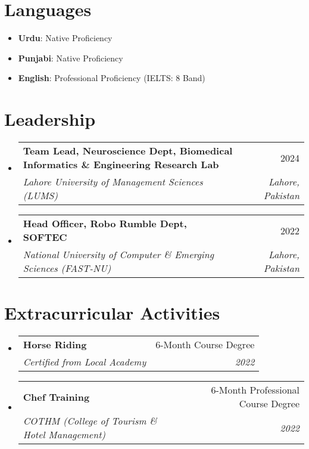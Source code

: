 \documentclass[letterpaper,10pt]{article}
\makeatletter
\newcommand{\resumeItem}[2]{
  \item\small{
    \textbf{#1}{: #2 \vspace{-2pt}}
  }
}
\newcommand{\resumeSubheading}[4]{
  \vspace{-1pt}\item
    \begin{tabular*}{0.97\textwidth}[t]{l@{\extracolsep{\fill}}r}
      \textbf{#1} & #2 \\
      \textit{\small#3} & \textit{\small #4} \\
    \end{tabular*}\vspace{-5pt}
}
\newcommand{\resumeSubItem}[2]{\resumeItem{#1}{#2}\vspace{-4pt}}
\newcommand{\resumeSubHeadingListStart}{\begin{itemize}[leftmargin=*]}
\newcommand{\resumeSubHeadingListEnd}{\end{itemize}}
\makeatother
\begin{document}
\section{Languages}
 \resumeSubHeadingListStart
    \resumeSubItem{Urdu}{Native Proficiency}
    \resumeSubItem{Punjabi}{Native Proficiency}
    \resumeSubItem{English}{Professional Proficiency (IELTS: 8 Band)}
 \resumeSubHeadingListEnd

\section{Leadership}
 \resumeSubHeadingListStart
    \resumeSubheading
        {Team Lead, Neuroscience Dept, Biomedical Informatics \& Engineering Research Lab}{2024}
        {Lahore University of Management Sciences (LUMS)}{Lahore, Pakistan}
    \resumeSubheading
        {Head Officer, Robo Rumble Dept, SOFTEC}{2022}
        {National University of Computer \& Emerging Sciences (FAST-NU)}{Lahore, Pakistan}
 \resumeSubHeadingListEnd

\section{Extracurricular Activities}
 \resumeSubHeadingListStart
    \resumeSubheading
        {Horse Riding}{6-Month Course Degree}
        {Certified from Local Academy}{2022}
    \resumeSubheading
        {Chef Training}{6-Month Professional Course Degree}
        {COTHM (College of Tourism \& Hotel Management)}{2022}
 \resumeSubHeadingListEnd

\end{document}
